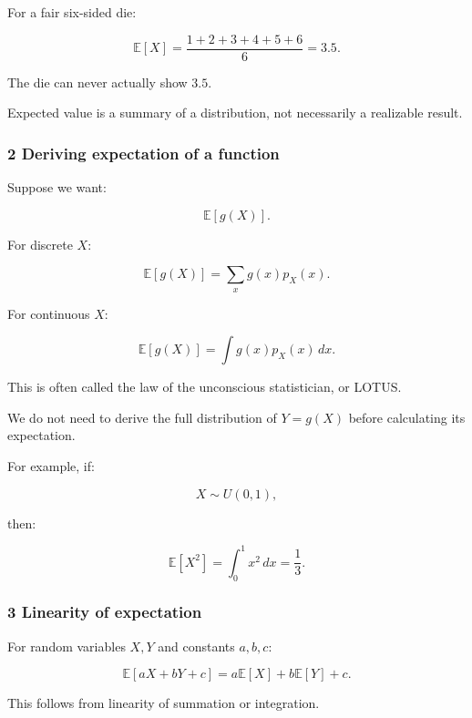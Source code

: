 \hypertarget{02-foundations-ii-ch023-expectation-is-not-necessarily-a-possible-outcome}{}

For a fair six-sided die:

\[
 \mathbb E[X] = \frac{1+2+3+4+5+6}{6} =\boxed{3.5}.
\]

The die can never actually show \(3.5\).

Expected value is a summary of a distribution, not necessarily a realizable result.

\subsubsection{2 Deriving expectation of a function}\label{02-foundations-ii-ch023-deriving-expectation-of-a-function}

\hypertarget{02-foundations-ii-ch023-deriving-expectation-of-a-function}{}

Suppose we want:

\[
 \mathbb E[g(X)].
\]

For discrete \(X\):

\[
 \boxed{ \mathbb E[g(X)] = \sum_xg(x)p_X(x) }.
\]

For continuous \(X\):

\[
 \boxed{ \mathbb E[g(X)] = \int g(x)p_X(x)\,dx }.
\]

This is often called the law of the unconscious statistician, or LOTUS.

We do not need to derive the full distribution of \(Y=g(X)\) before calculating its expectation.

For example, if:

\[
 X\sim U(0,1),
\]

then:

\[
 \mathbb E[X^2] = \int_0^1x^2\,dx =\boxed{\frac13}.
\]

\subsubsection{3 Linearity of expectation}\label{02-foundations-ii-ch023-linearity-of-expectation}

\hypertarget{02-foundations-ii-ch023-linearity-of-expectation}{}

For random variables \(X,Y\) and constants \(a,b,c\):

\[
 \boxed{ \mathbb E[aX+bY+c] = a\mathbb E[X]+b\mathbb E[Y]+c }.
\]

This follows from linearity of summation or integration.

